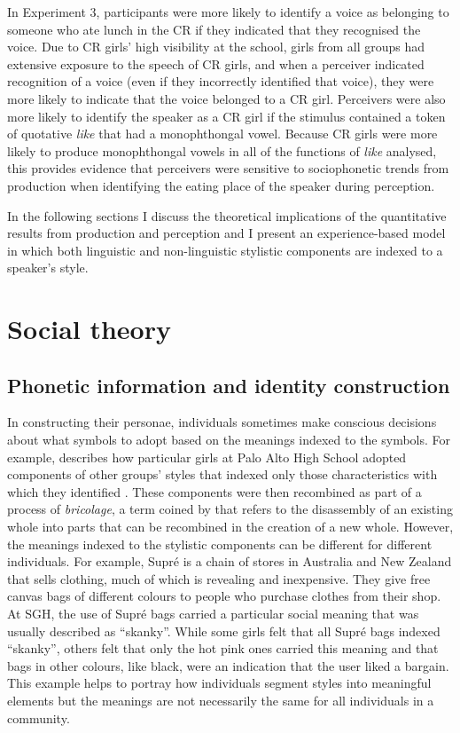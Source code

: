 In Experiment 3, participants were more likely to identify a voice as belonging to someone who ate lunch in the CR if they indicated that they recognised the voice.  Due to CR girls' high visibility at the school, girls from all groups had extensive exposure to the speech of CR girls, and when a perceiver indicated recognition of a voice (even if they incorrectly identified that voice), they were more likely to indicate that the voice belonged to a CR girl.   Perceivers were also more likely to identify the speaker as a CR girl if the stimulus contained a token of quotative \textit{like} that had a monophthongal vowel.  Because CR girls were more likely to produce monophthongal vowels in all of the functions of \textit{like} analysed, this provides evidence that perceivers were sensitive to sociophonetic trends from production when identifying the eating place of the speaker during perception.

In the following sections I discuss the theoretical implications of the quantitative results from production and perception and I present an experience-based model in which both linguistic and non-linguistic stylistic components are indexed to a speaker's style.


\section{Social theory}

\subsection{Phonetic information and identity construction}

In constructing their personae, individuals sometimes make conscious decisions about what symbols to adopt based on the meanings indexed to the symbols.  For example,  describes how particular girls at Palo Alto High School adopted components of other groups' styles that indexed only those characteristics with which they identified \cite[457]{eckert2008}.  These components were then recombined as part of a process of \textit{bricolage}, a term coined by  that refers to the disassembly of an existing whole into parts that can be recombined in the creation of a new whole. However, the meanings indexed to the stylistic components can be different for different individuals.  For example, Supr\'{e} is a chain of stores in Australia and New Zealand that sells clothing, much of which is revealing and inexpensive.  They give free canvas bags of different colours to people who purchase clothes from their shop.  At SGH, the use of Supr\'{e} bags carried a particular social meaning that was usually described as ``skanky''.  While some girls felt that all Supr\'{e} bags indexed ``skanky'', others felt that only the hot pink ones carried this meaning and that bags in other colours, like black, were an indication that the user liked a bargain.  This example helps to portray how individuals segment styles into meaningful elements but the meanings are not necessarily the same for all individuals in a community.  


